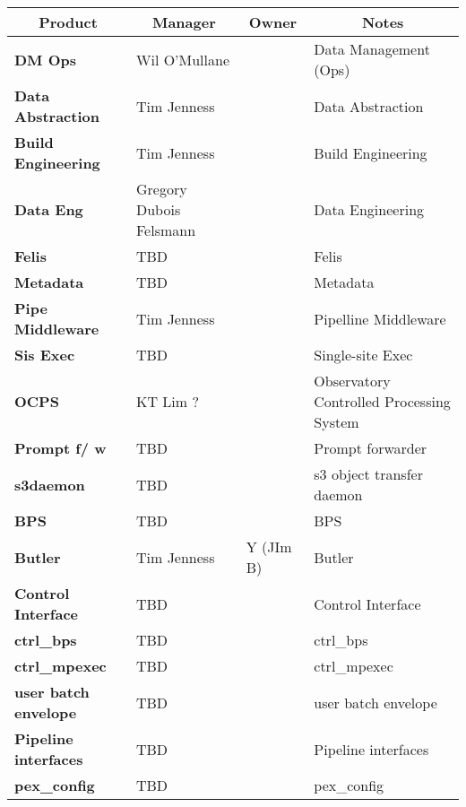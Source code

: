 

\scriptsize
\begin{longtable} {
|p{}   |p{}|p{} |p{}|}
\multicolumn{1}{c|}{\textbf{Product}} &
\multicolumn{1}{c|}{\textbf{Manager}} &
\multicolumn{1}{c|}{\textbf{Owner}} &
\multicolumn{1}{c}{\textbf{Notes}}|\\ \hline
{\textbf{DM Ops}} & Wil O'Mullane &  & Data Management (Ops) \\ \hline
{\textbf{Data Abstraction}} & Tim Jenness &  & Data Abstraction \\ \hline
{\textbf{Build Engineering}} & Tim Jenness &  & Build Engineering \\ \hline
{\textbf{Data Eng}} & Gregory Dubois Felsmann &  & Data Engineering \\ \hline
{\textbf{Felis}} & TBD &  & Felis \\ \hline
{\textbf{Metadata}} & TBD &  & Metadata \\ \hline
{\textbf{Pipe Middleware}} & Tim Jenness &  & Pipelline Middleware \\ \hline
{\textbf{Sis Exec}} & TBD &  & Single-site Exec \\ \hline
{\textbf{OCPS}} & KT Lim ? &  & Observatory Controlled Processing System \\ \hline
{\textbf{Prompt f/ w}} & TBD &  & Prompt forwarder \\ \hline
{\textbf{s3daemon}} & TBD &  & s3 object transfer daemon \\ \hline
{\textbf{BPS}} & TBD &  & BPS \\ \hline
{\textbf{Butler}} & Tim Jenness & Y (JIm B) & Butler \\ \hline
{\textbf{Control Interface}} & TBD &  & Control Interface \\ \hline
{\textbf{ctrl\_bps}} & TBD &  & ctrl\_bps \\ \hline
{\textbf{ctrl\_mpexec}} & TBD &  & ctrl\_mpexec \\ \hline
{\textbf{user batch envelope}} & TBD &  & user batch envelope \\ \hline
{\textbf{Pipeline interfaces}} & TBD &  & Pipeline interfaces \\ \hline
{\textbf{pex\_config}} & TBD &  & pex\_config \\ \hline

\end{longtable}
